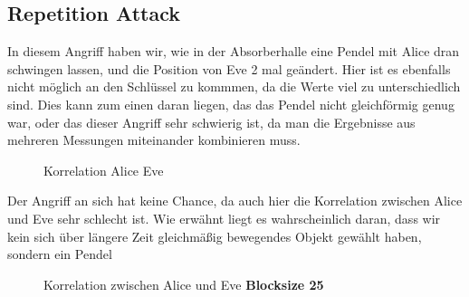\documentclass[12pt,a4paper]{article}
\begin{document}
\subsection*{Repetition Attack}
In diesem Angriff haben wir, wie in der Absorberhalle eine Pendel mit Alice dran schwingen lassen, und die Position von Eve 2 mal geändert. Hier ist es ebenfalls nicht möglich an den Schlüssel zu kommmen, da die Werte viel zu unterschiedlich sind. Dies kann zum einen daran liegen, das das Pendel nicht gleichförmig genug war, oder das dieser Angriff sehr schwierig ist, da man die Ergebnisse aus mehreren Messungen miteinander kombinieren muss.
\begin{figure}[H]
\centering
{} \qquad
{}
\caption{Korrelation Alice Eve}
\label{fig:rep1}
\end{figure}
Der Angriff an sich hat keine Chance, da auch hier die Korrelation zwischen Alice und Eve sehr schlecht ist. Wie erwähnt liegt es wahrscheinlich daran, dass wir kein sich über längere Zeit gleichmäßig bewegendes Objekt gewählt haben, sondern ein Pendel
\begin{figure}[H]
\centering
{} \qquad
{}
\caption{Korrelation zwischen Alice und Eve \textbf{Blocksize 25}}
\label{fig:rep2}
\end{figure}
\end{document}

